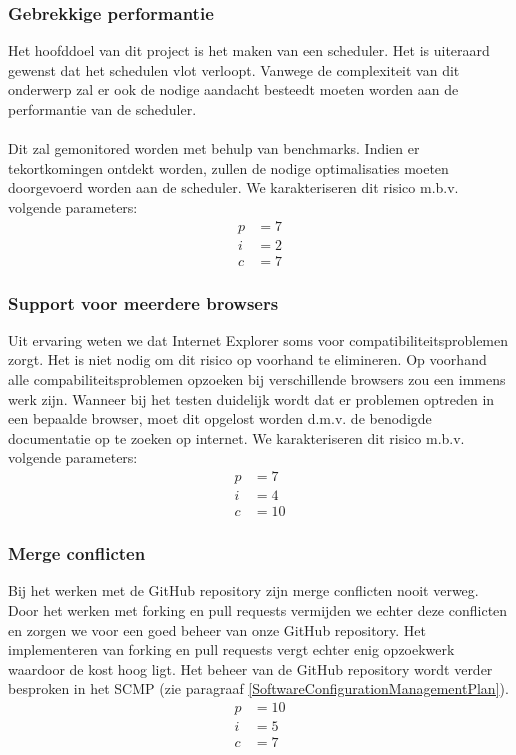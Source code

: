 \subsubsection{Gebrekkige performantie}
Het hoofddoel van dit project is het maken van een scheduler. Het is uiteraard gewenst dat het schedulen vlot verloopt. Vanwege de complexiteit van dit onderwerp zal er ook de nodige aandacht besteedt moeten worden aan de performantie van de scheduler.
\\
\\
Dit zal gemonitored worden met behulp van benchmarks. Indien er tekortkomingen ontdekt worden, zullen de nodige optimalisaties moeten doorgevoerd worden aan de scheduler. We karakteriseren dit risico m.b.v. volgende parameters:
\begin{align*}
	p &= 7\\
	i &= 2\\
	c &= 7
\end{align*}

\subsubsection{Support voor meerdere browsers}
Uit ervaring weten we dat Internet Explorer soms voor compatibiliteitsproblemen zorgt. Het is niet nodig om dit risico op voorhand te elimineren. Op voorhand alle compabiliteitsproblemen opzoeken bij verschillende browsers zou een immens werk zijn. Wanneer bij het testen duidelijk wordt dat er problemen optreden in een bepaalde browser, moet dit opgelost worden d.m.v. de benodigde documentatie op te zoeken op internet. We karakteriseren dit risico m.b.v. volgende parameters:
\begin{align*}
	p &= 7\\
	i &= 4\\
	c &= 10
\end{align*}

\subsubsection{Merge conflicten}
Bij het werken met de GitHub repository zijn merge conflicten nooit verweg. Door het werken met forking en pull requests vermijden we echter deze conflicten en zorgen we voor een goed beheer van onze GitHub repository. Het implementeren van forking en pull requests vergt echter enig opzoekwerk waardoor de kost hoog ligt. Het beheer van de GitHub repository wordt verder besproken in het SCMP (zie paragraaf \ref{SoftwareConfigurationManagementPlan}).
\begin{align*}
	p &= 10\\
	i &= 5\\
	c &= 7
\end{align*}


